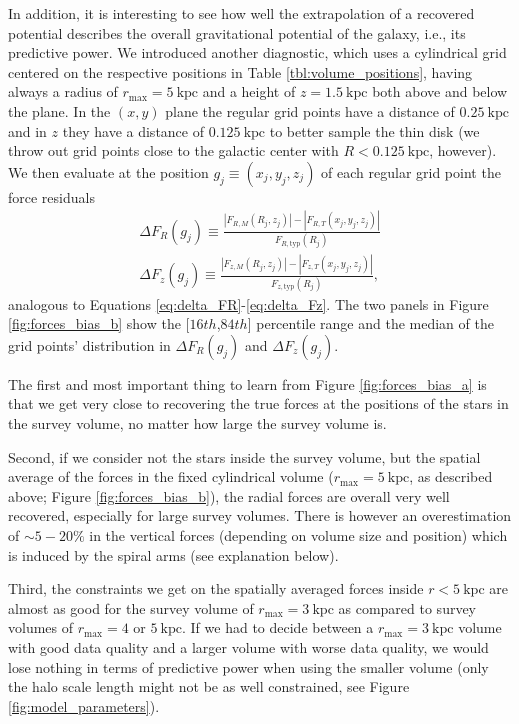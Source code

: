 \documentclass[iop,revtex4,numberedappendix,appendixfloats]{emulateapj}
\begin{document}
In addition, it is interesting to see how well the extrapolation of a recovered potential describes the overall gravitational potential of the galaxy, i.e., its predictive power. We introduced another diagnostic, which uses a cylindrical grid centered on the respective positions in Table \ref{tbl:volume_positions}, having always a radius of $r_\text{max}=5~\text{kpc}$ and a height of $z=1.5~\text{kpc}$ both above and below the plane.  In the $(x,y)$ plane the regular grid points have a distance of $0.25~\text{kpc}$ and in $z$ they have a distance of  $0.125~\text{kpc}$ to better sample the thin disk (we throw out grid points close to the galactic center with $R<0.125~\text{kpc}$, however). We then evaluate at the position $g_j \equiv (x_j,y_j,z_j)$ of each regular grid point the force residuals
\begin{eqnarray}
\Delta F_R(g_j) \equiv \frac{|F_{R,M}(R_j,z_j)| - |F_{R,T}(x_j,y_j,z_j)|}{F_{R,\text{typ}}(R_j)} \label{eq:delta_FR_grid}\\
\Delta F_z(g_j) \equiv \frac{|F_{z,M}(R_j,z_j)| - |F_{z,T}(x_j,y_j,z_j)|}{F_{z,\text{typ}}(R_j)},\label{eq:delta_Fz_grid}
\end{eqnarray}
analogous to Equations \eqref{eq:delta_FR}-\eqref{eq:delta_Fz}. The two panels in Figure \ref{fig:forces_bias_b} show the [$16th$,$84th$] percentile range and the median of the grid points' distribution in $\Delta F_R(g_j)$ and $\Delta F_z(g_j)$.

The first and most important thing to learn from Figure \ref{fig:forces_bias_a} is that we get very close to recovering the true forces at the positions of the stars in the survey volume, no matter how large the survey volume is.

Second, if we consider not the stars inside the survey volume, but the spatial average of the forces in the fixed cylindrical volume ($r_\text{max}=5~\text{kpc}$, as described above; Figure \ref{fig:forces_bias_b}), the radial forces are overall very well recovered, especially for large survey volumes. There is however an overestimation of $\sim5-20\%$ in the vertical forces (depending on volume size and position) which is induced by the spiral arms (see explanation below).

Third, the constraints we get on the spatially averaged forces inside $r<5~\text{kpc}$ are almost as good for the survey volume of $r_\text{max}=3~\text{kpc}$ as compared to survey volumes of $r_\text{max}=4$ or $5~\text{kpc}$. If we had to decide between a $r_\text{max}=3~\text{kpc}$ volume with good data quality and a larger volume with worse data quality, we would lose nothing in terms of predictive power when using the smaller volume (only the halo scale length might not be as well constrained, see Figure \ref{fig:model_parameters}).
\end{document}
